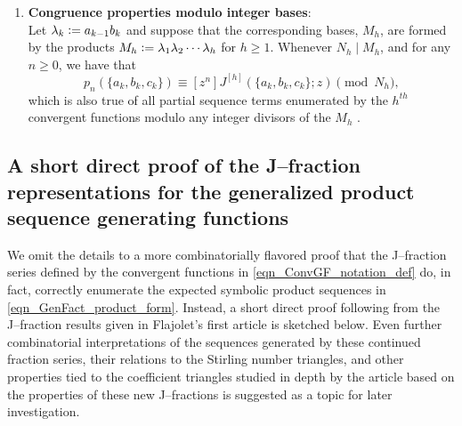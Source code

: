 \documentclass[12pt,reqno]{article}
\numberwithin{sfootnote}{section}
\numberwithin{equation}{section}
\newcommand{\itemlabel}[1]{\textbf{#1}: \\ }
\theoremstyle{plain}
\theoremstyle{definition}
\theoremstyle{remark}
\newcommand{\cf}[0]{cf.\ }
\newcommand{\defequals}{\ensuremath{\vcentcolon=}}
\begin{document}
\begin{enumerate}
\item \itemlabel{Congruence properties modulo integer bases} 
Let $\lambda_k \defequals a_{k-1} b_{k}$ and suppose that the 
corresponding bases, $M_h$, are formed by the products 
$M_h \defequals \lambda_1 \lambda_2 \cdots \lambda_h$ for $h \geq 1$. 
Whenever $N_h \mid M_h$, and for any $n \geq 0$, we have that 
\begin{equation} 
\label{eqn_EnumProps_Of_JTypeCFracs_congruence_rels-stmt_v1} 
p_n(\{a_k, b_k, c_k\}) \equiv [z^n] J^{[h]}(\{a_k, b_k, c_k\}; z) \pmod{N_h}, 
\end{equation} 
which is also true of all partial sequence terms enumerated by the 
$h^{th}$ convergent functions modulo any integer divisors of the $M_h$ 
\citep[\cf \S 5.7]{GFLECT}. 

\end{enumerate} 

\subsection{A short direct proof of the J--fraction representations for the 
            generalized product sequence generating functions} 
\label{subSection_GenCFrac_Reps_for_GenFactFns} 

We omit the details to a more combinatorially flavored proof that the 
J--fraction series defined by the convergent functions in 
\eqref{eqn_ConvGF_notation_def} do, in fact, correctly enumerate the expected 
symbolic product sequences in \eqref{eqn_GenFact_product_form}. 
Instead, a short direct proof following from the J--fraction results 
given in Flajolet's first article is sketched below. 
Even further combinatorial interpretations of the sequences generated by 
these continued fraction series, 
their relations to the Stirling number triangles, and other 
properties tied to the coefficient triangles studied in depth by the article 
\citep{MULTIFACTJIS} based on the properties of these new 
J--fractions is suggested as a topic for later investigation. 
\end{document}
